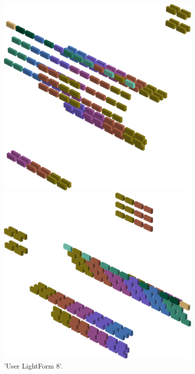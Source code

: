 \begin{minipage}[b]{0.48\linewidth}
\begin{figure}[H]
    \centering
    \begin{adjustbox}{width=5cm,margin=0cm 0cm}
      \includegraphics[width=10cm]{src/colorspace_patterns/pattern16-45.png}%
    \end{adjustbox}
    \begin{adjustbox}{width=5cm,margin=0cm 0cm}
      \includegraphics[width=10cm]{src/colorspace_patterns/pattern16-225.png}%
    \end{adjustbox}
\caption{'User LightForm 8'.}
\end{figure}
\end{minipage}
